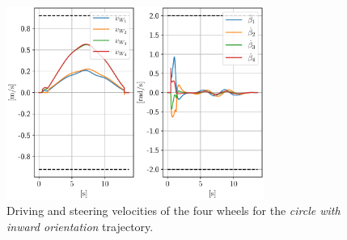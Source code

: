 \begin{figure}
    \centering
    \includegraphics[width=0.75\textwidth]{figures/SWMR/simulations/circular_with_inward_orientation/wheels_velocities.pdf}
    \caption{Driving and steering velocities of the four wheels for the \textit{circle with inward orientation} trajectory.}
    \label{fig:simulations:circle-with-inward-orientation:wheel-velocities}
\end{figure}

